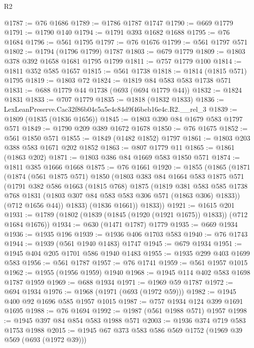 \begin{lexlean}{R2}
\begin{coremodule}
@1787 := @76 @1686
@1789 := @1786 @1787 @1747
@1790 := @669 @1779
@1791 := @1790 @140
@1794 := @1791 @393 @1682 @1688
@1795 := @76 @1684
@1796 := @561 @1795
@1797 := @76 @1676
@1799 := @561 @1797 @571
@1802 := @1794 (@1796 @1799) @1787
@1803 := @679 @1779
@1809 := @1803 @378 @392 @1658 @1681 @1795 @1799
@1811 := @757 @1779 @100
@1814 := @1811 @352 @585 @1657
@1815 := @561 @1738
@1818 := @1814 (@1815 @571) @1795
@1819 := @1803 @72
@1824 := @1819 @84 @583 @583 @1738 @571
@1831 := @688 @1779 @44 @1738 (@693 (@694 @1779 @44))
@1832 := @1824 @1831
@1833 := @707 @1779
@1835 := @1818 (@1832 @1833)
@1836 := LexLeanPreserve.Cac32f86b04c5a5e4c84d9f46beb16e4c.R2.__rel_3
@1839 := @1809 (@1835 (@1836 @1656))
@1845 := @1803 @390 @84 @1679 @583 @1797 @571
@1849 := @1790 @209 @389 @1672 @1678
@1850 := @76 @1675
@1852 := @561 @1850 @571
@1855 := @1849 (@1482 @1852) @1797
@1861 := @1803 @203 @388 @583 @1671 @202 @1852
@1863 := @807 @1779 @11
@1865 := @1861 (@1863 @202)
@1871 := @1803 @386 @84 @1669 @583 @1850 @571
@1874 := @1811 @385 @1666 @1668
@1875 := @76 @1661
@1920 := @1855
    (@1865
      (@1871
        (@1874
          (@561 @1875 @571)
          @1850
          (@1803
            @383
            @84
            @1664
            @583
            @1875
            @571
            (@1791
              @382
              @586
              @1663
              (@1815 @768)
              @1875
              (@1819
                @381
                @583
                @585
                @1738
                @768
                @1831
                (@1803 @307 @84 @583 @583 @306 @571 (@1863 @306) @1833))
              (@712 @1656 @44))
            @1833)
          (@1836 @1661))
        @1833))
@1921 := @1615 @201
@1931 := @1789 (@1802 (@1839 (@1845 (@1920 (@1921 @1675)) @1833)) (@712 @1684 @1676))
@1934 := @630 (@1471 @1787) @1779
@1935 := @669 @1934
@1936 := @1935 @196
@1939 := @1936 @406 @1703 @583
@1940 := @76 @1743
@1944 := @1939 (@561 @1940 @1483) @1747
@1945 := @679 @1934
@1951 := @1945 @404 @205 @1701 @586 @1940 @1483
@1955 := @1935 @299 @403 @1699 @583
@1956 := @561 @1787
@1957 := @76 @1741
@1959 := @561 @1957 @1015
@1962 := @1955 (@1956 @1959) @1940
@1968 := @1945 @114 @402 @583 @1698 @1787 @1959
@1969 := @688 @1934
@1971 := @1969 @59 @1787
@1972 := @694 @1934
@1976 := @1968 (@1971 (@693 (@1972 @59)))
@1982 := @1945 @400 @92 @1696 @585 @1957 @1015
@1987 := @757 @1934 @124 @399 @1691 @1695
@1988 := @76 @1694
@1992 := @1987 (@561 @1988 @571) @1957
@1998 := @1945 @397 @84 @854 @583 @1988 @571
@2003 := @1936 @374 @719 @583 @1753 @1988
@2015 := @1945 @67 @373 @583 @586 @569 @1752 (@1969 @39 @569 (@693 (@1972 @39)))

\end{coremodule}
\end{lexlean}
